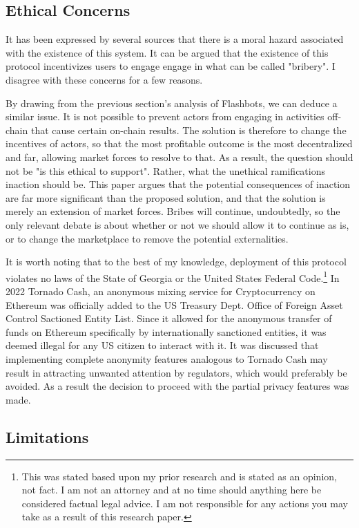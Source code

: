 \documentclass{article}
\begin{document}
\subsection{Ethical Concerns}

It has been expressed by several sources that there is a moral hazard associated with the existence of this system. It can be argued that the existence of this protocol incentivizes users to engage engage in what can be called "bribery". I disagree with these concerns for a few reasons.

By drawing from the previous section's analysis of Flashbots, we can deduce a similar issue. It is not possible to prevent actors from engaging in activities off-chain that cause certain on-chain results. The solution is therefore to change the incentives of actors, so that the most profitable outcome is the most decentralized and far, allowing market forces to resolve to that. As a result, the question should not be "is this ethical to support". Rather, what the unethical ramifications inaction should be. This paper argues that the potential consequences of inaction are far more significant than the proposed solution, and that the solution is merely an extension of market forces. Bribes will continue, undoubtedly, so the only relevant debate is about whether or not we should allow it to continue as is, or to change the marketplace to remove the potential externalities. 

It is worth noting that to the best of my knowledge, deployment of this protocol violates no laws of the State of Georgia or the United States Federal Code.\footnote{This was stated based upon my prior research and is stated as an opinion, not fact. I am not an attorney and at no time should anything here be considered factual legal advice. I am not responsible for any actions you may take as a result of this research paper.} In 2022 Tornado Cash, an anonymous mixing service for Cryptocurrency on Ethereum was officially added to the US Treasury Dept. Office of Foreign Asset Control Sactioned Entity List. Since it allowed for the anonymous transfer of funds on Ethereum specifically by internationally sanctioned entities, it was deemed illegal for any US citizen to interact with it. It was discussed that implementing complete anonymity features analogous to Tornado Cash may result in attracting unwanted attention by regulators, which would preferably be avoided. As a result the decision to proceed with the partial privacy features was made.

\subsection{Limitations}
\end{document}

